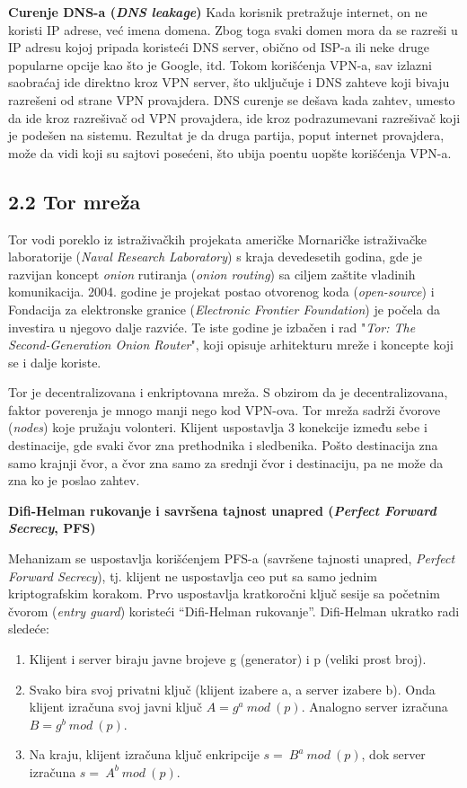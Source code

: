 \documentclass[
]{article}
\begin{document}
\textbf{Curenje DNS-a (\emph{DNS leakage})} Kada korisnik pretražuje internet,
on ne koristi IP adrese, već imena domena. Zbog toga svaki domen mora da
se razreši u IP adresu kojoj pripada koristeći DNS server, obično od
ISP-a ili neke druge popularne opcije kao što je Google, itd. Tokom
korišćenja VPN-a, sav izlazni saobraćaj ide direktno kroz VPN server,
što uključuje i DNS zahteve koji bivaju razrešeni od strane VPN
provajdera. DNS curenje se dešava kada zahtev, umesto da ide kroz
razrešivač od VPN provajdera, ide kroz podrazumevani razrešivač koji je
podešen na sistemu. Rezultat je da druga partija, poput internet provajdera, može da vidi koji su sajtovi posećeni, što ubija poentu uopšte korišćenja VPN-a.

\subsection{2.2 Tor mreža}
\label{sec:t2.2}

Tor vodi poreklo iz istraživačkih projekata američke Mornaričke
istraživačke laboratorije (\emph{Naval Research Laboratory}) s kraja
devedesetih godina, gde je razvijan koncept \emph{onion} rutiranja (\emph{onion routing}) sa
ciljem zaštite vladinih komunikacija. 2004. godine je projekat postao
otvorenog koda (\emph{open-source}) i Fondacija za elektronske granice (\emph{Electronic
Frontier Foundation}) je počela da investira u njegovo dalje razviće. Te
iste godine je izbačen i rad "\emph{Tor: The Second-Generation Onion
Router}", koji opisuje arhitekturu mreže i koncepte koji se i dalje
koriste.

Tor je decentralizovana i enkriptovana mreža. S obzirom da je
decentralizovana, faktor poverenja je mnogo manji nego kod VPN-ova. Tor
mreža sadrži čvorove (\emph{nodes}) koje pružaju volonteri. Klijent uspostavlja
3 konekcije između sebe i destinacije, gde svaki čvor zna prethodnika i
sledbenika. Pošto destinacija zna samo krajnji čvor, a čvor zna
samo za srednji čvor i destinaciju, pa ne može da zna ko je poslao
zahtev. 

\textbf{Difi-Helman rukovanje i savršena tajnost unapred (\emph{Perfect Forward Secrecy}, PFS)}

Mehanizam se uspostavlja korišćenjem PFS-a (savršene tajnosti unapred, \emph{Perfect Forward Secrecy}),
tj. klijent ne uspostavlja ceo put sa samo jednim kriptografskim
korakom. Prvo uspostavlja kratkoročni ključ sesije sa početnim čvorom
(\emph{entry guard}) koristeći ``Difi-Helman rukovanje''. Difi-Helman
ukratko radi sledeće: 
\begin{enumerate}
\def\labelenumi{\arabic{enumi}.}
\item
  Klijent i server biraju javne brojeve g
(generator) i p (veliki prost broj).
\item
   Svako bira svoj privatni ključ
(klijent izabere a, a server izabere b). Onda klijent izračuna svoj javni ključ $A = g^{a}\ mod\ (p)$.
Analogno server izračuna $B = g^{b}\ mod\ (p)$.
\item
  Na kraju, klijent
izračuna ključ enkripcije $s = \ B^{a}\ mod\ (p)$, dok server izračuna
$s = \ A^{b}\ mod\ (p)$.
\end{enumerate}
\end{document}
